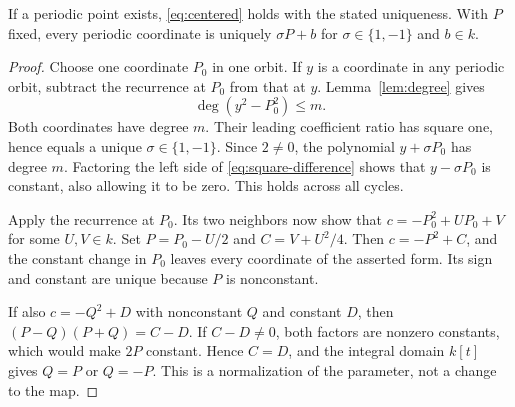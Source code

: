 \begin{proposition}\label{prop:branches}
If a periodic point exists, \eqref{eq:centered} holds with the
stated uniqueness. With $P$ fixed, every periodic coordinate is
uniquely $\sigma P+b$ for $\sigma\in\{1,-1\}$ and $b\in k$.
\end{proposition}
\begin{proof}
Choose one coordinate $P_0$ in one orbit. If $y$ is a coordinate in
any periodic orbit, subtract the recurrence at $P_0$ from that at
$y$. Lemma~\ref{lem:degree} gives
\begin{equation}\label{eq:square-difference}
 \deg(y^2-P_0^2)\le m.
\end{equation}
Both coordinates have degree $m$. Their leading coefficient ratio
has square one, hence equals a unique $\sigma\in\{1,-1\}$.
Since $2\ne0$, the polynomial $y+\sigma P_0$ has degree $m$.
Factoring the left side of \eqref{eq:square-difference} shows that
$y-\sigma P_0$ is constant, also allowing it to be zero.
This holds across all cycles.

Apply the recurrence at $P_0$. Its two neighbors now show that
$c=-P_0^2+U P_0+V$ for some $U,V\in k$. Set
$P=P_0-U/2$ and $C=V+U^2/4$. Then $c=-P^2+C$, and the
constant change in $P_0$ leaves every coordinate of the asserted
form. Its sign and constant are unique because $P$ is nonconstant.

If also $c=-Q^2+D$ with nonconstant $Q$ and constant $D$, then
$(P-Q)(P+Q)=C-D$. If $C-D\ne0$, both factors are nonzero
constants, which would make $2P$ constant. Hence $C=D$, and
the integral domain $k[t]$ gives $Q=P$ or $Q=-P$.
This is a normalization of the parameter, not a change to the map.
\end{proof}
